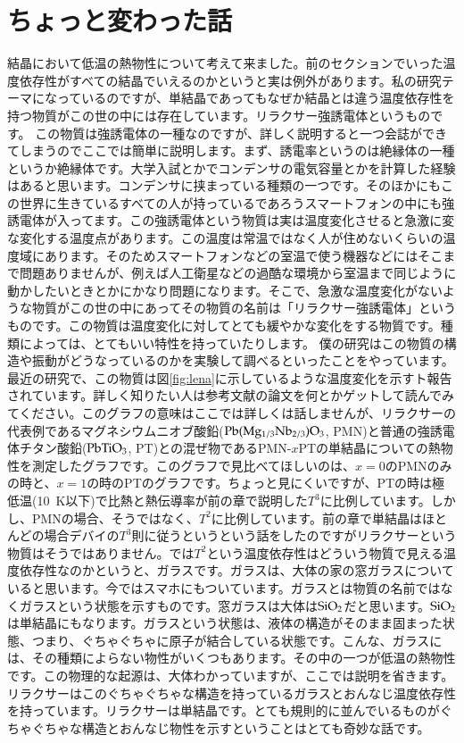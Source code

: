 \documentclass[10pt,b5paper,papersize,dvipdfmx]{jsbook}
\begin{document}
\section{ちょっと変わった話}
結晶において低温の熱物性について考えて来ました。前のセクションでいった温度依存性がすべての結晶でいえるのかというと実は例外があります。私の研究テーマになっているのですが、単結晶であってもなぜか結晶とは違う温度依存性を持つ物質がこの世の中には存在しています。リラクサー強誘電体というものです。
この物質は強誘電体の一種なのですが、詳しく説明すると一つ会誌ができてしまうのでここでは簡単に説明します。まず、誘電率というのは絶縁体の一種というか絶縁体です。大学入試とかでコンデンサの電気容量とかを計算した経験はあると思います。コンデンサに挟まっている種類の一つです。そのほかにもこの世界に生きているすべての人が持っているであろうスマートフォンの中にも強誘電体が入ってます。この強誘電体という物質は実は温度変化させると急激に変な変化する温度点があります。この温度は常温ではなく人が住めないくらいの温度域にあります。そのためスマートフォンなどの室温で使う機器などにはそこまで問題ありませんが、例えば人工衛星などの過酷な環境から室温まで同じように動かしたいときとかにかなり問題になります。そこで、急激な温度変化がないような物質がこの世の中にあってその物質の名前は「リラクサー強誘電体」というものです。この物質は温度変化に対してとても緩やかな変化をする物質です。種類によっては、とてもいい特性を持っていたりします。
僕の研究はこの物質の構造や振動がどうなっているのかを実験して調べるといったことをやっています。最近の研究で、この物質は図\ref{fig:lena}に示しているような温度変化を示すト報告されています。詳しく知りたい人は参考文献\cite{relaxCT}の論文を何とかゲットして読んでみてください。このグラフの意味はここでは詳しくは話しませんが、リラクサーの代表例であるマグネシウムニオブ酸鉛($\rm{Pb(Mg_{1/3}Nb_{2/3})O_3}$, PMN)と普通の強誘電体チタン酸鉛($\rm{PbTiO_3}$, PT)との混ぜ物であるPMN-$x$PTの単結晶についての熱物性を測定したグラフです。このグラフで見比べてほしいのは、$x = 0$のPMNのみの時と、$x = 1$の時のPTのグラフです。ちょっと見にくいですが、PTの時は極低温(10~K以下)で比熱と熱伝導率が前の章で説明した$T^3$に比例しています。しかし、PMNの場合、そうではなく、$T^2$に比例しています。前の章で単結晶はほとんどの場合デバイの$T^3$則に従うというという話をしたのですがリラクサーという物質はそうではありません。では$T^2$という温度依存性はどういう物質で見える温度依存性なのかというと、ガラスです。ガラスは、大体の家の窓ガラスについていると思います。今ではスマホにもついています。ガラスとは物質の名前ではなくガラスという状態を示すものです。窓ガラスは大体は$\rm{SiO}_2$だと思います。$\rm{SiO}_2$は単結晶にもなります。ガラスという状態は、液体の構造がそのまま固まった状態、つまり、ぐちゃぐちゃに原子が結合している状態です。こんな、ガラスには、その種類によらない物性がいくつもあります。その中の一つが低温の熱物性です。この物理的な起源は、大体わかっていますが、ここでは説明を省きます。リラクサーはこのぐちゃぐちゃな構造を持っているガラスとおんなじ温度依存性を持っています。リラクサーは単結晶です。とても規則的に並んでいるものがぐちゃぐちゃな構造とおんなじ物性を示すということはとても奇妙な話です。\par
\end{document}

